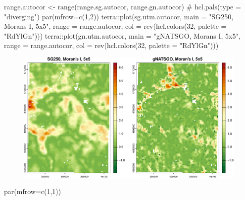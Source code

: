 \documentclass[
  letterpaper,
  DIV=11,
  numbers=noendperiod]{scrartcl}
\newenvironment{Shaded}{\begin{snugshade}}{\end{snugshade}}
\newcommand{\AttributeTok}[1]{\textcolor[rgb]{0.40,0.45,0.13}{#1}}
\newcommand{\CommentTok}[1]{\textcolor[rgb]{0.37,0.37,0.37}{#1}}
\newcommand{\DecValTok}[1]{\textcolor[rgb]{0.68,0.00,0.00}{#1}}
\newcommand{\FunctionTok}[1]{\textcolor[rgb]{0.28,0.35,0.67}{#1}}
\newcommand{\NormalTok}[1]{\textcolor[rgb]{0.00,0.23,0.31}{#1}}
\newcommand{\OtherTok}[1]{\textcolor[rgb]{0.00,0.23,0.31}{#1}}
\newcommand{\SpecialCharTok}[1]{\textcolor[rgb]{0.37,0.37,0.37}{#1}}
\newcommand{\StringTok}[1]{\textcolor[rgb]{0.13,0.47,0.30}{#1}}
\begin{document}
\begin{Shaded}
\begin{Highlighting}[]
\NormalTok{range.autocor }\OtherTok{\textless{}{-}} \FunctionTok{range}\NormalTok{(range.sg.autocor, range.gn.autocor)}
\CommentTok{\# hcl.pals(type = "diverging")}
\FunctionTok{par}\NormalTok{(}\AttributeTok{mfrow=}\FunctionTok{c}\NormalTok{(}\DecValTok{1}\NormalTok{,}\DecValTok{2}\NormalTok{))}
\NormalTok{terra}\SpecialCharTok{::}\FunctionTok{plot}\NormalTok{(sg.utm.autocor, }\AttributeTok{main =} \StringTok{"SG250, Moran\textquotesingle{}s I, 5x5"}\NormalTok{, }
            \AttributeTok{range =}\NormalTok{ range.autocor, }\AttributeTok{col =} \FunctionTok{rev}\NormalTok{(}\FunctionTok{hcl.colors}\NormalTok{(}\DecValTok{32}\NormalTok{, }\AttributeTok{palette =} \StringTok{"RdYlGn"}\NormalTok{)))}
\NormalTok{terra}\SpecialCharTok{::}\FunctionTok{plot}\NormalTok{(gn.utm.autocor, }\AttributeTok{main =} \StringTok{"gNATSGO, Moran\textquotesingle{}s I, 5x5"}\NormalTok{, }
            \AttributeTok{range =}\NormalTok{ range.autocor, }\AttributeTok{col =} \FunctionTok{rev}\NormalTok{(}\FunctionTok{hcl.colors}\NormalTok{(}\DecValTok{32}\NormalTok{, }\AttributeTok{palette =} \StringTok{"RdYlGn"}\NormalTok{)))}
\end{Highlighting}
\end{Shaded}

\begin{figure}[H]

{\centering \includegraphics{PatternAnalysisWorkshopTutorial_files/figure-pdf/moving-window-5-1.pdf}

}

\end{figure}

\begin{Shaded}
\begin{Highlighting}[]
\FunctionTok{par}\NormalTok{(}\AttributeTok{mfrow=}\FunctionTok{c}\NormalTok{(}\DecValTok{1}\NormalTok{,}\DecValTok{1}\NormalTok{))}
\end{Highlighting}
\end{Shaded}
\end{document}
